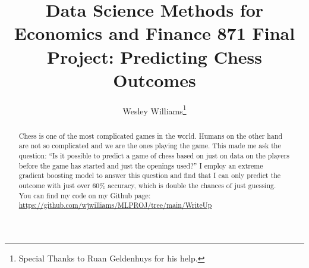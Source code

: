 \documentclass[12pt,preprint, authoryear]{elsarticle}
\numberwithin{equation}{section}
\numberwithin{figure}{section}
\numberwithin{table}{section}
\let\rmarkdownfootnote\footnote%
\def\footnote{\protect\rmarkdownfootnote}
\begin{document}
\begin{frontmatter}  %

\title{Data Science Methods for Economics and Finance 871 Final Project:
Predicting Chess Outcomes}





\author[Add1]{Wesley Williams\footnote{Special Thanks to Ruan Geldenhuys
  for his help.}}





\address[Add1]{Stellenbosch University, South Africa}


\begin{abstract}
\small{
Chess is one of the most complicated games in the world. Humans on the
other hand are not so complicated and we are the ones playing the game.
This made me ask the question: ``Is it possible to predict a game of
chess based on just on data on the players before the game has started
and just the openings used?'' I employ an extreme gradient boosting
model to answer this question and find that I can only predict the
outcome with just over 60\% accuracy, which is double the chances of
just guessing. You can find my code on my Github page:
\url{https://github.com/wjwilliams/MLPROJ/tree/main/WriteUp}
}
\end{abstract}

\vspace{1cm}





\vspace{0.5cm}

\end{frontmatter}

\setcounter{footnote}{0}


\renewcommand{\contentsname}{Table of Contents}
{\tableofcontents}

\pagestyle{fancy}
\chead{}
\rhead{}
\lfoot{}
\lhead{}
\cfoot{}


\headsep 35pt %




\newpage
\end{document}
